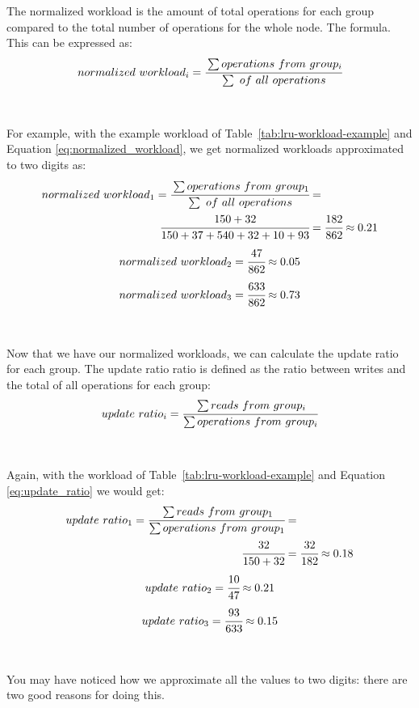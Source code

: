 The normalized workload is the amount of total operations for each group compared to the total number of operations for the whole node. The formula. This can be expressed as:
\begin{equation} \label{eq:normalized_workload}
  normalized\ workload_i =  \cfrac{\sum operations\ from\ group_i}{\sum\ of\ all\ operations}
\end{equation}
\\\\
For example, with the example workload of Table~\ref{tab:lru-workload-example} and Equation \ref{eq:normalized_workload}, we get normalized workloads approximated to two digits as: 
\begin{align*}
  normalized\ workload_1 = \cfrac{\sum operations\ from\ group_1}{\sum\ of\ all\ operations} &=\\ \cfrac{150+32}{150+37+540+32+10+93} &= \cfrac{182}{862} \approx 0.21
\end{align*}
\begin{equation*}
  normalized\ workload_2 = \cfrac{47}{862} \approx 0.05
\end{equation*}
\begin{equation*}
  normalized\ workload_3 = \cfrac{633}{862} \approx 0.73
\end{equation*}
\\\\
Now that we have our normalized workloads, we can calculate the update ratio for each group. The update ratio ratio is defined as the ratio between writes and the total of all operations for each group:
\begin{equation} \label{eq:update_ratio}
  update\ ratio_i =  \cfrac{\sum reads\ from\ group_i}{\sum operations\ from\ group_i}
\end{equation}
\\\\
Again, with the workload of Table~\ref{tab:lru-workload-example} and Equation \ref{eq:update_ratio} we would get:
\begin{align*}
  update\ ratio_1 =  \cfrac{\sum reads\ from\ group_1}{\sum operations\ from\ group_1} &=\\ \cfrac{32}{150+32} &= \cfrac{32}{182} \approx 0.18
\end{align*}
\begin{equation*}
  update\ ratio_2 = \cfrac{10}{47} \approx 0.21
\end{equation*}
\begin{equation*}
  update\ ratio_3 = \cfrac{93}{633} \approx 0.15
\end{equation*}
\\\\
You may have noticed how we approximate all the values to two digits: there are two good reasons for doing this.

